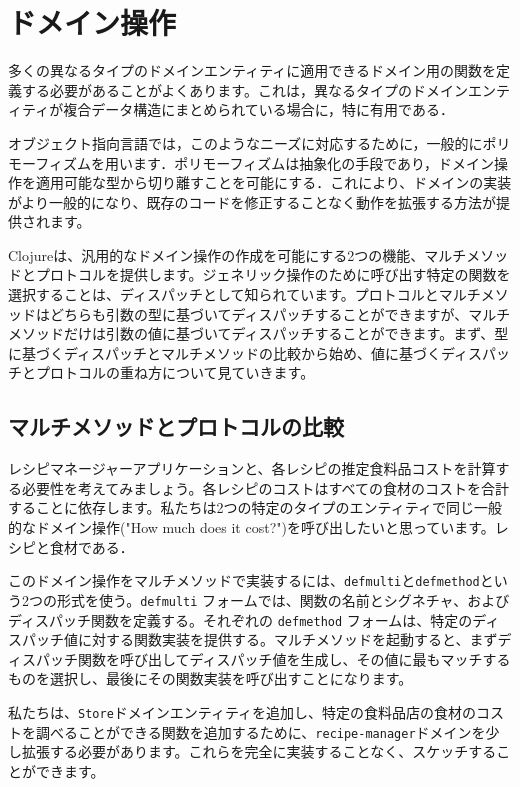 \section{ドメイン操作}

多くの異なるタイプのドメインエンティティに適用できるドメイン用の関数を定義する必要があることがよくあります。これは，異なるタイプのドメインエンティティが複合データ構造にまとめられている場合に，特に有用である．

オブジェクト指向言語では，このようなニーズに対応するために，一般的にポリモーフィズムを用います．ポリモーフィズムは抽象化の手段であり，ドメイン操作を適用可能な型から切り離すことを可能にする．これにより、ドメインの実装がより一般的になり、既存のコードを修正することなく動作を拡張する方法が提供されます。

Clojureは、汎用的なドメイン操作の作成を可能にする2つの機能、マルチメソッドとプロトコルを提供します。ジェネリック操作のために呼び出す特定の関数を選択することは、ディスパッチとして知られています。プロトコルとマルチメソッドはどちらも引数の型に基づいてディスパッチすることができますが、マルチメソッドだけは引数の値に基づいてディスパッチすることができます。まず、型に基づくディスパッチとマルチメソッドの比較から始め、値に基づくディスパッチとプロトコルの重ね方について見ていきます。

\subsection{マルチメソッドとプロトコルの比較}

レシピマネージャーアプリケーションと、各レシピの推定食料品コストを計算する必要性を考えてみましょう。各レシピのコストはすべての食材のコストを合計することに依存します。私たちは2つの特定のタイプのエンティティで同じ一般的なドメイン操作("How much does it cost?")を呼び出したいと思っています。レシピと食材である．

このドメイン操作をマルチメソッドで実装するには、\texttt{defmulti}と\texttt{defmethod}という2つの形式を使う。\texttt{defmulti} フォームでは、関数の名前とシグネチャ、およびディスパッチ関数を定義する。それぞれの \texttt{defmethod} フォームは、特定のディスパッチ値に対する関数実装を提供する。マルチメソッドを起動すると、まずディスパッチ関数を呼び出してディスパッチ値を生成し、その値に最もマッチするものを選択し、最後にその関数実装を呼び出すことになります。

私たちは、\texttt{Store}ドメインエンティティを追加し、特定の食料品店の食材のコストを調べることができる関数を追加するために、\texttt{recipe-manager}ドメインを少し拡張する必要があります。これらを完全に実装することなく、スケッチすることができます。

